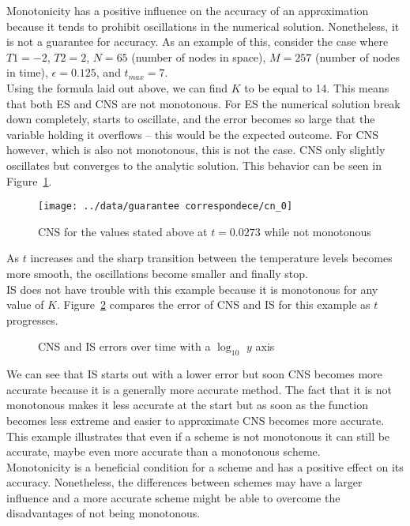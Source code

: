 \documentclass[a4paper, 12pt, reqno]{article}
\newcommand{\figref}[1]{Figure~\ref{#1}}
\begin{document}
Monotonicity has a positive influence on the accuracy of an approximation
because it tends to prohibit oscillations in the numerical solution.
Nonetheless, it is not a guarantee for accuracy. As an example of this,
consider the case where $T1=-2$, $T2=2$, $N=65$ (number of nodes in space),
$M=257$ (number of nodes in time), $\epsilon = 0.125$, and $t_{max} = 7$.\\
Using the formula laid out above, we can find $K$ to be equal to 14. This means
that both ES and CNS are not monotonous. For ES the numerical solution break
down completely, starts to oscillate, and the error becomes so large that the 
variable holding it overflows -- this would be the expected outcome. For CNS
however, which is also not monotonous, this is not the case. CNS only slightly
oscillates but converges to the analytic solution. This behavior can be seen in
\figref{ma01}.
\begin{figure}[H]
    \center
    \texttt{[image: ../data/guarantee correspondece/cn\_0]}
    \vspace{-20pt}
    \caption{CNS for the values stated above at $t = 0.0273$ while not
    monotonous}
    \label{ma01}
\end{figure}
As $t$ increases and the sharp transition between the temperature levels
becomes more smooth, the oscillations become smaller and finally stop.\\
IS does not have trouble with this example because it is monotonous for any
value of $K$. \figref{ma02} compares the error of CNS and IS for this example
as $t$ progresses.
\begin{figure}[H]
    \center
    \vspace{-20pt}
    \caption{CNS and IS errors over time with a $\log_{10}$ $y$ axis}
    \label{ma02}
\end{figure}
We can see that IS starts out with a lower error but soon CNS becomes more
accurate because it is a generally more accurate method. The fact that it is
not monotonous makes it less accurate at the start but as soon as the function
becomes less extreme and easier to approximate CNS becomes more accurate.
This example illustrates that even if a scheme is not monotonous it can still
be accurate, maybe even more accurate than a monotonous scheme.\\
Monotonicity is a beneficial condition for a scheme and has a positive effect
on its accuracy. Nonetheless, the differences between schemes may have a larger
influence and a more accurate scheme might be able to overcome the
disadvantages of not being monotonous.
\end{document}

